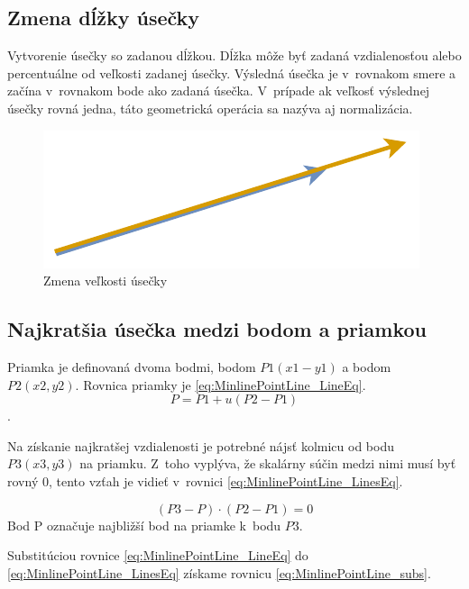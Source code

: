 \subsection*{Zmena dĺžky úsečky}
Vytvorenie úsečky so zadanou dĺžkou. Dĺžka môže byť zadaná vzdialenosťou alebo percentuálne od veľkosti zadanej úsečky. Výsledná úsečka je v~rovnakom smere a začína v~rovnakom bode ako zadaná úsečka. V~prípade ak veľkosť výslednej úsečky rovná jedna, táto geometrická operácia sa nazýva aj normalizácia.  


\begin{figure}[H]
	\centering
	\includegraphics[]{obrazky-figures/Diagram/Draw/2Line/DP Navrh operacii-1D - LineChangeLength.pdf}
	\caption{Zmena veľkosti úsečky}
	\label{fig:LineChangeLength}
\end{figure}

\subsection*{Najkratšia úsečka medzi bodom a priamkou}\label{sec:najkratsiauseckaBP}
Priamka je definovaná dvoma bodmi, bodom $P1(x1-y1)$ a bodom $P2(x2,y2)$. 
Rovnica priamky je \ref{eq:MinlinePointLine_LineEq}.
\begin{equation}
    P = P1 + u(P2-P1)
    \label{eq:MinlinePointLine_LineEq}
\end{equation}. 

Na získanie najkratšej vzdialenosti je potrebné nájsť kolmicu od bodu $P3(x3,y3)$ na priamku. Z~toho vyplýva, že skalárny súčin medzi nimi musí byť rovný 0, tento vzťah je vidieť v~rovnici \ref{eq:MinlinePointLine_LinesEq}.

\begin{equation}
    (P3-P)\cdot(P2-P1) =0 
    \label{eq:MinlinePointLine_LinesEq}
\end{equation}
Bod P označuje najbližší bod na priamke k~bodu $P3$.

Substitúciou rovnice \ref{eq:MinlinePointLine_LineEq} do \ref{eq:MinlinePointLine_LinesEq} získame rovnicu \ref{eq:MinlinePointLine_subs}.

